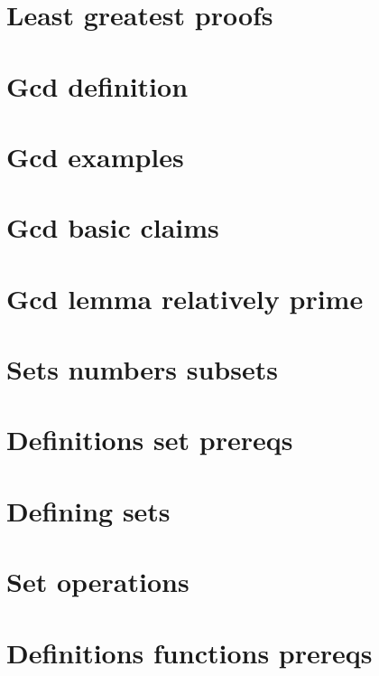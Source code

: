 
\section*{Least greatest proofs}

\vfill
\section*{Gcd definition}

\vfill
\section*{Gcd examples}

\vfill
\section*{Gcd basic claims}

\vfill
\section*{Gcd lemma relatively prime}

\vfill
\section*{Sets numbers subsets}

\vfill
\section*{Definitions set prereqs}

\vfill
\section*{Defining sets}

\vfill
\section*{Set operations}

\vfill
\section*{Definitions functions prereqs}

\vfill
